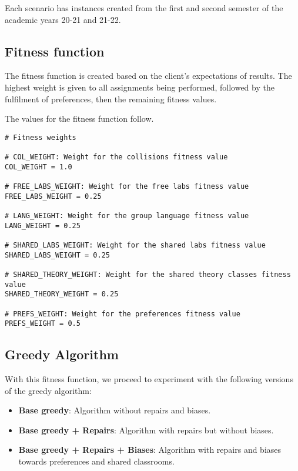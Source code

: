 Each scenario has instances created from the first and second semester of the academic years 20-21 and 21-22.

\subsection{Fitness function}

The fitness function is created based on the client's expectations of results. The highest weight is given to all assignments being performed, followed by the fulfilment of preferences, then the remaining fitness values.

The values for the fitness function follow.

\begin{lstlisting}[basicstyle=\small]
# Fitness weights

# COL_WEIGHT: Weight for the collisions fitness value
COL_WEIGHT = 1.0

# FREE_LABS_WEIGHT: Weight for the free labs fitness value
FREE_LABS_WEIGHT = 0.25

# LANG_WEIGHT: Weight for the group language fitness value
LANG_WEIGHT = 0.25

# SHARED_LABS_WEIGHT: Weight for the shared labs fitness value
SHARED_LABS_WEIGHT = 0.25

# SHARED_THEORY_WEIGHT: Weight for the shared theory classes fitness value
SHARED_THEORY_WEIGHT = 0.25

# PREFS_WEIGHT: Weight for the preferences fitness value
PREFS_WEIGHT = 0.5
\end{lstlisting}



\subsection{Greedy Algorithm}

With this fitness function, we proceed to experiment with the following versions of the greedy algorithm:

\begin{itemize}
    \item \textbf{Base greedy}: Algorithm without repairs and biases.
    \item \textbf{Base greedy + Repairs}: Algorithm with repairs but without biases.
    \item \textbf{Base greedy + Repairs + Biases}: Algorithm with repairs and biases towards preferences and shared classrooms.
\end{itemize}


